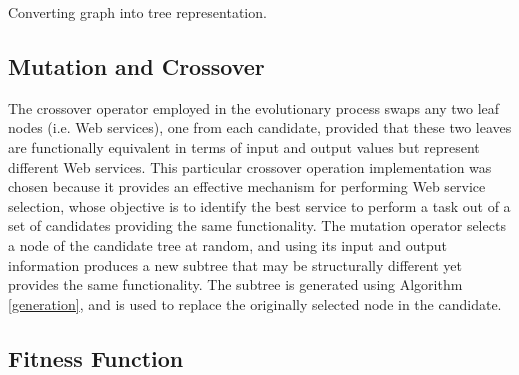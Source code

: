 \documentclass[conference]{IEEEtran}
\begin{document}
\begin{algorithm}
 \setlength{}
 \LinesNumbered
 \SetNlSty{}{}{:}
 \vspace{2mm}
 \caption{\footnotesize Converting graph into tree representation.}
\label{toTree}
\end{algorithm} 

\subsection{Mutation and Crossover}\label{mutation}

The crossover operator employed in the evolutionary process swaps any two leaf nodes (i.e. Web services), one from each candidate, provided that these two leaves are functionally equivalent in terms of input and output values but represent different Web services. This particular crossover operation implementation was chosen because it provides an effective mechanism for performing Web service selection, whose objective is to identify the best service to perform a task out of a set of candidates providing the same functionality.
The mutation operator selects a node of the candidate tree at random, and using its input and output information produces a new subtree that may be structurally different yet provides the same functionality. The subtree is generated using Algorithm \ref{generation}, and is used to  replace the originally selected node in the candidate.


\subsection{Fitness Function}\label{fitness}
\end{document}
